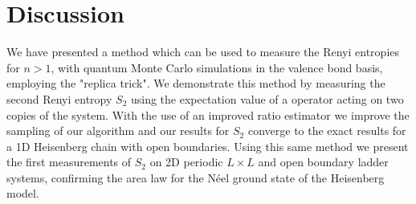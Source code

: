 \section{Discussion}



We have presented a method which can be used to measure the Renyi entropies for $n>1$, with quantum Monte Carlo simulations in the valence bond basis, employing the "replica trick".
We demonstrate this method by measuring the second Renyi entropy $S_2$ using the expectation value of a \swa operator acting on two copies of the system.
With the use of an improved ratio estimator we improve the sampling of our algorithm and our results for $S_2$ converge to the exact results for a 1D Heisenberg chain with open boundaries.
Using this same method we present the first measurements of $S_2$ on 2D periodic $L \times L$ and open boundary ladder systems, confirming the area law for the N\'eel ground state of the Heisenberg model.
 






